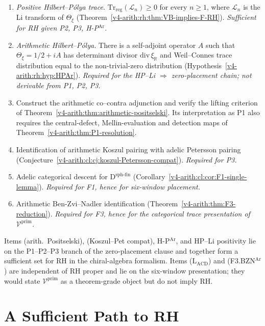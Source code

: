 \begin{enumerate}
\item[\textbf{(HP--Li)}] \emph{Positive Hilbert--P\'olya trace.}
\(\mathrm{Tr}_{\mathrm{reg}}(\mathcal L_{n})\geq0\) for every
\(n\geq1\), where \(\mathcal L_{n}\) is the Li transform of
\(\Theta_{\xi}\)
(Theorem~\ref{v4-arith:rh:thm:VB-implies-F-RH}).
\emph{Sufficient for RH given P2, P3, H-P\(^{\mathrm{Ar}}\).}
\item[\textbf{(H-P\(^{\mathrm{Ar}}\))}] \emph{Arithmetic Hilbert--P\'olya.}
There is a self-adjoint operator \(A\) such
that \(\Theta_{\xi}=1/2+iA\) has determinant divisor
\(\mathrm{div}\,\xi_{\mathbb R}\) and Weil--Connes trace distribution equal to the
non-trivial-zero distribution
(Hypothesis~\ref{v4-arith:rh:hyp:HPAr}).
\emph{Required for the HP--Li \(\Rightarrow\) zero-placement chain; not
derivable from P1, P2, P3.}
\item[(arith.~Positselski)] Construct the arithmetic co--contra
adjunction and verify the lifting criterion of
Theorem~\ref{v4-arith:thm:arithmetic-positselski}.
Its interpretation as P1 also requires the central-defect,
Mellin-evaluation and detection maps of
Theorem~\ref{v4-arith:thm:P1-resolution}.
\item[(Koszul--Pet compat)] Identification of arithmetic Koszul
pairing with adelic Petersson pairing
(Conjecture~\ref{v4-arith:cl:cj:koszul-Petersson-compat}).
\emph{Required for P3.}
\item[(\(\mathrm{L}_{\mathrm{ACD}}\))] Adelic categorical descent
for \(\mathrm{D}^{\mathrm{sph\text{-}fin}}\)
(Corollary~\ref{v4-arith:cl:cor:F1-single-lemma}).
\emph{Required for F1, hence for six-window placement.}
\item[(F3.BZN\(^{\mathrm{Ar}}\))] Arithmetic Ben-Zvi--Nadler
identification (Theorem~\ref{v4-arith:thm:F3-reduction}).
\emph{Required for F3, hence for the categorical trace presentation
of \(\mathcal{V}^{\mathrm{prim}}\).}
\end{enumerate}

Items (arith.~Positselski), (Koszul--Pet compat), H-P\(^{\mathrm{Ar}}\),
and HP--Li positivity lie on the P1--P2--P3 branch of the
zero-placement clause and together form a sufficient set for RH in the
chiral-algebra formalism. Items (\(\mathrm{L}_{\mathrm{ACD}}\)) and
(F3.BZN\(^{\mathrm{Ar}}\)) are independent of RH proper and lie on
the six-window presentation; they would state
\(\mathcal{V}^{\mathrm{prim}}\) as a theorem-grade object but do
not imply RH.

\section{A Sufficient Path to RH}
\label{v4-arith:rh:sufficient-path}

